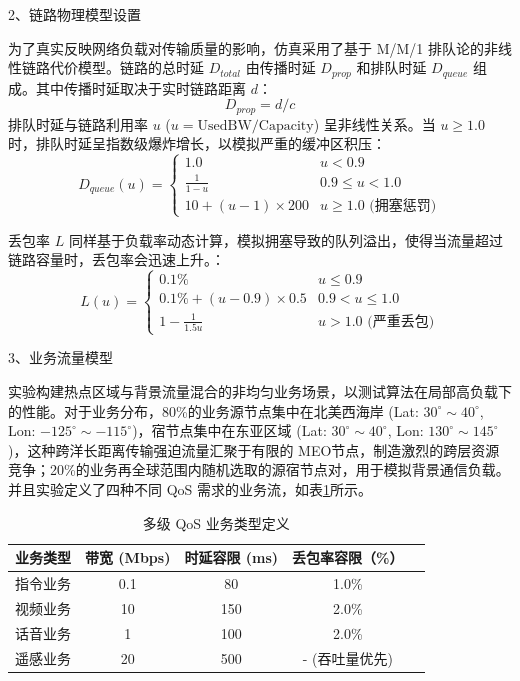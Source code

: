     
    2、链路物理模型设置
    
    为了真实反映网络负载对传输质量的影响，仿真采用了基于 M/M/1 排队论的非线性链路代价模型。链路的总时延 $D_{total}$ 由传播时延 $D_{prop}$ 和排队时延 $D_{queue}$ 组成。其中传播时延取决于实时链路距离 $d$：
    $$ D_{prop} = d / c $$
    排队时延与链路利用率 $u$ ($u = \text{UsedBW} / \text{Capacity}$) 呈非线性关系。当 $u \ge 1.0$ 时，排队时延呈指数级爆炸增长，以模拟严重的缓冲区积压：
    $$
    D_{queue}(u) =
    \begin{cases}
      1.0 & u < 0.9 \\
      \frac{1}{1-u} & 0.9 \le u < 1.0 \\
      10 + (u-1) \times 200 & u \ge 1.0 \text{ (拥塞惩罚)}
    \end{cases}
    $$
   
    丢包率 $L$ 同样基于负载率动态计算，模拟拥塞导致的队列溢出，使得当流量超过链路容量时，丢包率会迅速上升。：
    $$
    L(u) =
    \begin{cases}
      0.1\% & u \le 0.9 \\
      0.1\% + (u-0.9) \times 0.5 & 0.9 < u \le 1.0 \\
      1 - \frac{1}{1.5u} & u > 1.0 \text{ (严重丢包)}
    \end{cases}
    $$
    
    3、业务流量模型
    
    实验构建热点区域与背景流量混合的非均匀业务场景，以测试算法在局部高负载下的性能。对于业务分布，80\%的业务源节点集中在北美西海岸 (Lat: $30^{\circ}\sim40^{\circ}$, Lon: $-125^{\circ}\sim-115^{\circ}$)，宿节点集中在东亚区域 (Lat: $30^{\circ}\sim40^{\circ}$, Lon: $130^{\circ}\sim145^{\circ}$)，这种跨洋长距离传输强迫流量汇聚于有限的 MEO节点，制造激烈的跨层资源竞争；20\%的业务再全球范围内随机选取的源宿节点对，用于模拟背景通信负载。并且实验定义了四种不同 QoS 需求的业务流，如表\ref{tab: 多级 QoS 业务类型定义}所示。
    \begin{table}[htbp]
      \caption{多级 QoS 业务类型定义}
      \centering
      \begin{tabular}{lcccc}
        \toprule
        \textbf{业务类型} & \textbf{带宽 (Mbps)} & \textbf{时延容限 (ms)} & \textbf{丢包率容限（\%）}  \\
        \midrule
        指令业务 & 0.1 & 80 & 1.0\%  \\
        视频业务 & 10  & 150 &  2.0\%  \\
        话音业务 & 1   & 100 & 2.0\%  \\
        遥感业务 & 20  & 500 & - (吞吐量优先) \\
        \bottomrule
      \end{tabular}
      \label{tab: 多级 QoS 业务类型定义}
    \end{table}

